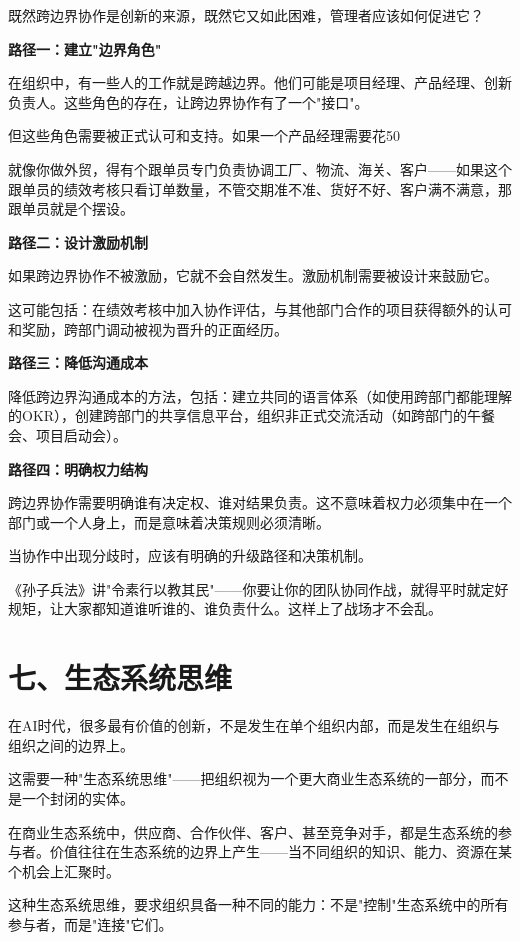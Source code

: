 既然跨边界协作是创新的来源，既然它又如此困难，管理者应该如何促进它？

\textbf{路径一：建立"边界角色"}

在组织中，有一些人的工作就是跨越边界。他们可能是项目经理、产品经理、创新负责人。这些角色的存在，让跨边界协作有了一个"接口"。

但这些角色需要被正式认可和支持。如果一个产品经理需要花50%

就像你做外贸，得有个跟单员专门负责协调工厂、物流、海关、客户——如果这个跟单员的绩效考核只看订单数量，不管交期准不准、货好不好、客户满不满意，那跟单员就是个摆设。

\textbf{路径二：设计激励机制}

如果跨边界协作不被激励，它就不会自然发生。激励机制需要被设计来鼓励它。

这可能包括：在绩效考核中加入协作评估，与其他部门合作的项目获得额外的认可和奖励，跨部门调动被视为晋升的正面经历。

\textbf{路径三：降低沟通成本}

降低跨边界沟通成本的方法，包括：建立共同的语言体系（如使用跨部门都能理解的OKR），创建跨部门的共享信息平台，组织非正式交流活动（如跨部门的午餐会、项目启动会）。

\textbf{路径四：明确权力结构}

跨边界协作需要明确谁有决定权、谁对结果负责。这不意味着权力必须集中在一个部门或一个人身上，而是意味着决策规则必须清晰。

当协作中出现分歧时，应该有明确的升级路径和决策机制。

《孙子兵法》讲"令素行以教其民"——你要让你的团队协同作战，就得平时就定好规矩，让大家都知道谁听谁的、谁负责什么。这样上了战场才不会乱。

\section{七、生态系统思维}


在AI时代，很多最有价值的创新，不是发生在单个组织内部，而是发生在组织与组织之间的边界上。

这需要一种"生态系统思维"——把组织视为一个更大商业生态系统的一部分，而不是一个封闭的实体。

在商业生态系统中，供应商、合作伙伴、客户、甚至竞争对手，都是生态系统的参与者。价值往往在生态系统的边界上产生——当不同组织的知识、能力、资源在某个机会上汇聚时。

这种生态系统思维，要求组织具备一种不同的能力：不是"控制"生态系统中的所有参与者，而是"连接"它们。

